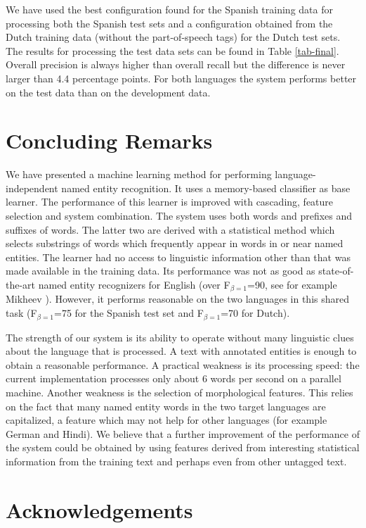 \documentclass[11pt]{article}
\begin{document}
We have used the best configuration found for the Spanish training
data for processing both the Spanish test sets and a configuration
obtained from the Dutch training data (without the part-of-speech
tags) for the Dutch test sets.
The results for processing the test data sets can be found in Table
\ref{tab-final}.
Overall precision is always higher than overall recall but the
difference is never larger than 4.4 percentage points.
For both languages the system performs better on the test data than
on the development data.

\section{Concluding Remarks}

We have presented a machine learning method for performing
language-independent named entity recognition.
It uses a memory-based classifier as base learner.
The performance of this learner is improved with cascading, feature
selection and system combination.
The system uses both words and prefixes and suffixes of words.
The latter two are derived with a statistical method which selects
substrings of words which frequently appear in words in or near
named entities.
The learner had no access to linguistic information other than that
was made available in the training data.
Its performance was not as good as state-of-the-art named entity
recognizers for English (over F$_{\beta=1}$=90, see for example
Mikheev ).
However, it performs reasonable on the two languages in this shared
task (F$_{\beta=1}$=75 for the Spanish test set and F$_{\beta=1}$=70
for Dutch).

The strength of our system is its ability to operate without many
linguistic clues about the language that is processed.
A text with annotated entities is enough to obtain a reasonable
performance.
A practical weakness is its processing speed: the current
implementation processes only about 6 words per second on a parallel
machine.
Another weakness is the selection of morphological features.
This relies on the fact that many named entity words in the two target
languages are capitalized, a feature which may not help for other
languages (for example German and Hindi).
We believe that a further improvement of the performance of the system
could be obtained by using features derived from interesting statistical
information from the training text and perhaps even from other
untagged text.


\section*{Acknowledgements}
\end{document}
